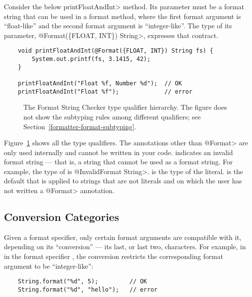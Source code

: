 Consider the below \<printFloatAndInt> method.  Its parameter must be a
format string that can be used in a format method, where the first format
argument is ``float-like'' and the second format argument is
``integer-like''.  The type of its parameter, \<@Format(\{FLOAT, INT\})
String>, expresses that contract.

\begin{Verbatim}
    void printFloatAndInt(@Format({FLOAT, INT}) String fs) {
        System.out.printf(fs, 3.1415, 42);
    } 

    printFloatAndInt("Float %f, Number %d");  // OK
    printFloatAndInt("Float %f");             // error
\end{Verbatim}

\begin{figure}
\caption{The Format String Checker type qualifier hierarchy.  The figure
  does not show the subtyping rules among different 
  qualifiers; see Section~\ref{formatter-format-subtyping}.}
\label{fig:formatter-hierarchy}
\end{figure}

Figure~\ref{fig:formatter-hierarchy} shows all the type qualifiers.
The annotations other than \<@Format> are only used
internally and cannot be written in your code.
 indicates an invalid format
string --- that is, a string that cannot be used as a format string.  For
example, the type of  is \<@InvalidFormat String>.
 is the type of the
 literal.
 is the default that is
applied to strings that are not literals and on which the user has not
written a \<@Format> annotation.

\subsection{Conversion Categories\label{formatter-categories}}

Given a format specifier, only certain format arguments are compatible with
it, depending on its ``conversion'' --- its last, or last two,
characters.  For example, in in the format specifier , the
conversion  restricts the corresponding format argument
to be ``integer-like'':

\begin{Verbatim}
    String.format("%d", 5);         // OK
    String.format("%d", "hello");   // error
\end{Verbatim}

